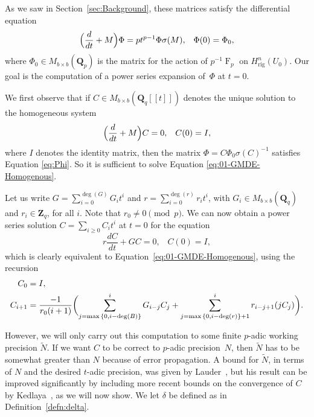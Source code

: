 \documentclass[a4paper,11pt]{article}
\numberwithin{equation}{section}
\newcommand{\ZZ}{\mathbf{Z}} %
\newcommand{\QQ}{\mathbf{Q}} %
\DeclareMathOperator{\Frob}{F}           %
\providecommand{\Hrig}{H_{\text{rig}}}  %
\theoremstyle{definition}
\begin{document}
As we saw in Section~\ref{sec:Background}, these matrices satisfy 
the differential equation
\begin{equation} \label{eq:Phi}
\Bigl(\frac{d}{dt} + M\Bigr) \Phi = p t^{p-1} \Phi \sigma(M), \;\;\; \Phi(0)=\Phi_0,
\end{equation}
where $\Phi_0 \in M_{b \times b}(\QQ_p)$ is the matrix for the action 
of $p^{-1} \Frob_p$ on $\Hrig^n(U_0)$. Our goal is the computation of 
a power series expansion of~$\Phi$ at $t=0$.

We first observe that if $C \in M_{b \times b}(\QQ_q[[t]])$ denotes 
the unique solution to the homogeneous system
\begin{equation} \label{eq:01-GMDE-Homogenous}
\Bigl(\frac{d}{dt} + M\Bigr) C = 0, \;\;\; C(0)=I,
\end{equation}
where $I$ denotes the identity matrix, then the matrix
$\Phi = C \Phi_0 \sigma(C)^{-1}$
satisfies Equation \eqref{eq:Phi}. So it is sufficient to solve Equation 
\eqref{eq:01-GMDE-Homogenous}.

Let us write $G = \sum_{i=0}^{\deg(G)} G_i t^i$ and $r= \sum_{i=0}^{\deg(r)} r_i t^i$,
with $G_i \in M_{b \times b}(\QQ_q)$ and $r_i \in \ZZ_q$, for all $i$. Note that
$r_0 \neq 0 \pmod{p}$.
We can now obtain a power series solution $C = \sum_{i \geq 0} C_i t^i$ at $t=0$ for 
the equation
\begin{equation*}
r \frac{dC}{dt} + G C = 0, \;\;\; C(0)=I,
\end{equation*}
which is clearly equivalent to Equation~\eqref{eq:01-GMDE-Homogenous}, 
using the recursion 
\begin{align}
C_0 &= I, \notag \\ 
C_{i+1} &= \frac{-1}{r_0 (i+1)} \biggl(
    \sum_{j=\max{\{0,i-\deg(B)\}}}^i G_{i-j} C_j + 
    \sum_{j=\max{\{0,i-\deg(r)\}}+1}^i r_{i-j+1} (j C_j) \biggr). \label{eq:recursiondifeq}
\end{align}

However, we will only carry out this computation to some finite $p$-adic 
working precision $\tilde{N}$. If we want $C$ to be correct to $p$-adic 
precision~$N$, then $\tilde{N}$ has to be somewhat greater than $N$ because 
of error propagation. A bound for $\tilde{N}$, in terms of $N$ and the 
desired $t$-adic precision, was given by Lauder~\citep[Theorem~5.1]{Lauder2006}, 
but his result can be improved significantly by including more recent bounds 
on the convergence of $C$ by Kedlaya~\citep{Kedlaya2010}, as we will now show. 
We let $\delta$ be defined as in Definition~\ref{defn:delta}. 
\end{document}
